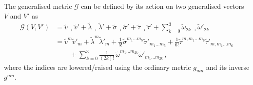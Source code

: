 \documentclass[debug]{phd}
\begin{document}
					The generalised metric $\mathcal{G}$ can be defined by its action on two generalised vectors $V$ and $V'$ as
							\begin{equation}\label{GofVandV'}
								\begin{split}
									\mathcal{G}(V,V')&= \tilde{v} \lrcorner \tilde{v}' + \tilde{\lambda} \lrcorner \tilde{\lambda}' + \tilde{\sigma} \lrcorner \tilde{\sigma}' + \tilde{\tau} \lrcorner \tilde{\tau}'+ \sum_{k=0}^3\tilde{\omega}_{2k} \lrcorner \tilde{\omega}'_{2k} \\
										&= \tilde{v}^m \tilde{v}'_m + \tilde{\lambda}^m \tilde{\lambda}'_m + \tfrac{1}{5!}\tilde{\sigma}^{m_1\ldots m_5} \tilde{\sigma}'_{m_1\ldots m_5} + \tfrac{1}{6!}\tilde{\tau}^{m,m_1\ldots m_6} \tilde{\tau}'_{m,m_1\ldots m_6} \\
											& \phantom{= +} + \sum_{k=0}^3\tfrac{1}{(2k)!}\,\tilde{\omega}^{m_1 \ldots m_{2k}} \tilde{\omega}'_{m_1 \ldots m_{2k}} \, ,
								\end{split}
							\end{equation}
					where the indices are lowered/raised using the ordinary metric $g_{mn}$ and its inverse $g^{mn}$.
					
\end{document}
